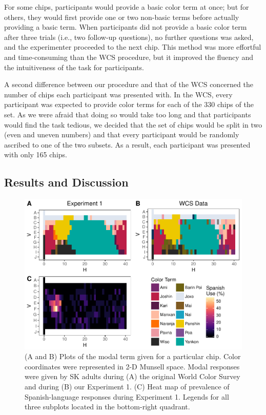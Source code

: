 \documentclass[
  english,
  ,man,floatsintext]{apa6}
\begin{document}
For some chips, participants would provide a basic color term at once; but for others, they would first provide one or two non-basic terms before actually providing a basic term. When participants did not provide a basic color term after three trials (i.e., two follow-up questions), no further questions was asked, and the experimenter proceeded to the next chip. This method was more effortful and time-consuming than the WCS procedure, but it improved the fluency and the intuitiveness of the task for participants.

A second difference between our procedure and that of the WCS concerned the number of chips each participant was presented with. In the WCS, every participant was expected to provide color terms for each of the 330 chips of the set. As we were afraid that doing so would take too long and that participants would find the task tedious, we decided that the set of chips would be split in two (even and uneven numbers) and that every participant would be randomly ascribed to one of the two subsets. As a result, each participant was presented with only 165 chips.

\hypertarget{results-and-discussion}{%
\subsection{Results and Discussion}\label{results-and-discussion}}

\begin{figure}
\centering
\includegraphics{amazon_color_files/figure-latex/adultfigure-1.pdf}
\caption{\label{fig:adultfigure}(A and B) Plots of the modal term given for a particular chip. Color coordinates were represented in 2-D Munsell space. Modal responses were given by SK adults during (A) the original World Color Survey and during (B) our Experiment 1. (C) Heat map of prevalence of Spanish-language responses during Experiment 1. Legends for all three subplots located in the bottom-right quadrant.}
\end{figure}
\end{document}
